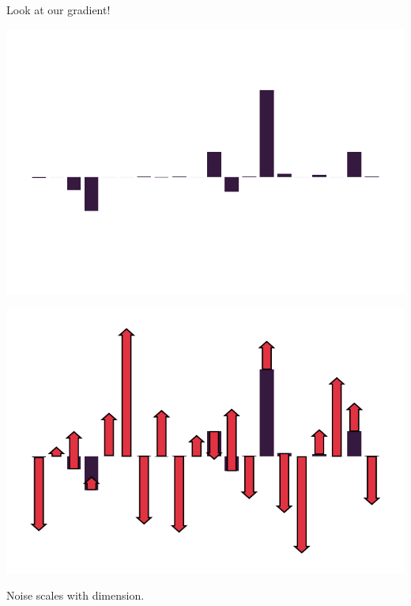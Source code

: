 \documentclass{beamer}
\begin{document}
\begin{frame}
  \vspace{1em}
  \begin{center}
    \Huge Look at our gradient!
  \end{center}

  \vspace{-2.32em}

  \includegraphics[width=\textwidth]{grad_example_1.pdf}

  \vspace{-2em}

  \begin{center}
  \end{center}
\end{frame}

\begin{frame}
  \vspace{1em}

  \includegraphics[width=\textwidth]{grad_example_2.pdf}

  \vspace{-1.5em}

  \begin{center}
    \Huge Noise scales with dimension. \Frowny{}
  \end{center}
  \addtocounter{framenumber}{-1}
\end{frame}
\end{document}
